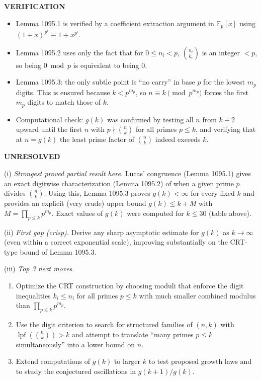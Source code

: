 \medskip
\noindent\textbf{VERIFICATION}

\smallskip
\noindent
\begin{itemize}
\item Lemma 1095.1 is verified by a coefficient extraction argument in $\mathbb{F}_p[x]$ using $(1+x)^{p^i}\equiv 1+x^{p^i}$.
\item Lemma 1095.2 uses only the fact that for $0\le n_i<p$, $\binom{n_i}{k_i}$ is an integer $<p$, so being $0\bmod p$ is equivalent to being $0$.
\item Lemma 1095.3: the only subtle point is ``no carry'' in base $p$ for the lowest $m_p$ digits. This is ensured because $k<p^{m_p}$, so $n\equiv k\pmod{p^{m_p}}$ forces the first $m_p$ digits to match those of $k$.
\item Computational check: $g(k)$ was confirmed by testing all $n$ from $k+2$ upward until the first $n$ with $p\nmid\binom{n}{k}$ for all primes $p\le k$, and verifying that at $n=g(k)$ the least prime factor of $\binom{n}{k}$ indeed exceeds $k$.
\end{itemize}

\medskip
\noindent\textbf{UNRESOLVED}

\smallskip
\noindent
(i) \emph{Strongest proved partial result here.}
Lucas' congruence (Lemma 1095.1) gives an exact digitwise characterization (Lemma 1095.2) of when a given prime $p$ divides $\binom{n}{k}$. Using this, Lemma 1095.3 proves $g(k)<\infty$ for every fixed $k$ and provides an explicit (very crude) upper bound $g(k)\le k+M$ with $M=\prod_{p\le k}p^{m_p}$.
Exact values of $g(k)$ were computed for $k\le 30$ (table above).

\smallskip
\noindent
(ii) \emph{First gap (crisp).}
Derive any sharp asymptotic estimate for $g(k)$ as $k\to\infty$ (even within a correct exponential scale), improving substantially on the CRT-type bound of Lemma 1095.3.

\smallskip
\noindent
(iii) \emph{Top 3 next moves.}
\begin{enumerate}
\item Optimize the CRT construction by choosing moduli that enforce the digit inequalities $k_i\le n_i$ for all primes $p\le k$ with much smaller combined modulus than $\prod_{p\le k}p^{m_p}$.
\item Use the digit criterion to search for structured families of $(n,k)$ with $\operatorname{lpf}(\binom{n}{k})>k$ and attempt to translate ``many primes $p\le k$ simultaneously'' into a lower bound on $n$.
\item Extend computations of $g(k)$ to larger $k$ to test proposed growth laws and to study the conjectured oscillations in $g(k+1)/g(k)$.
\end{enumerate}

